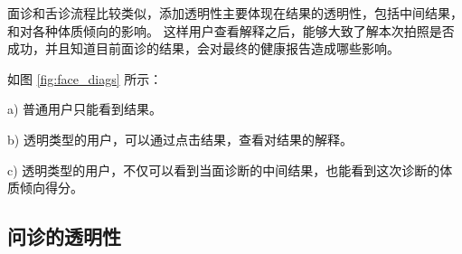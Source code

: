 面诊和舌诊流程比较类似，添加透明性主要体现在结果的透明性，包括中间结果，和对各种体质倾向的影响。
这样用户查看解释之后，能够大致了解本次拍照是否成功，并且知道目前面诊的结果，会对最终的健康报告造成哪些影响。

如图 \ref{fig:face_diags} 所示：

a) 普通用户只能看到结果。

b) 透明类型的用户，可以通过点击结果，查看对结果的解释。

c) 透明类型的用户，不仅可以看到当面诊断的中间结果，也能看到这次诊断的体质倾向得分。



\subsection{问诊的透明性}

